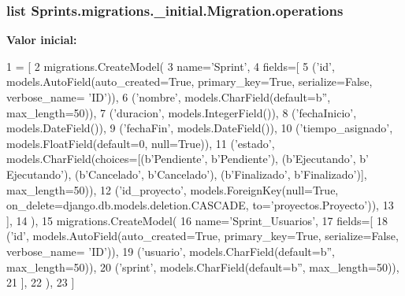 \subsubsection[{\texorpdfstring{operations}{operations}}]{\setlength{\rightskip}{0pt plus 5cm}list Sprints.\+migrations.\+\_\+initial.\+Migration.\+operations\hspace{0.3cm}{\ttfamily [static]}}\hypertarget{class_sprints_1_1migrations_1_10001__initial_1_1_migration_ab7ef4aab24ce79cb91f7d76fa8efae58}{}\label{class_sprints_1_1migrations_1_10001__initial_1_1_migration_ab7ef4aab24ce79cb91f7d76fa8efae58}
{\bfseries Valor inicial\+:}
\begin{DoxyCode}
1 = [
2         migrations.CreateModel(
3             name=\textcolor{stringliteral}{'Sprint'},
4             fields=[
5                 (\textcolor{stringliteral}{'id'}, models.AutoField(auto\_created=\textcolor{keyword}{True}, primary\_key=\textcolor{keyword}{True}, serialize=\textcolor{keyword}{False}, verbose\_name=\textcolor{stringliteral}{
      'ID'})),
6                 (\textcolor{stringliteral}{'nombre'}, models.CharField(default=b\textcolor{stringliteral}{''}, max\_length=50)),
7                 (\textcolor{stringliteral}{'duracion'}, models.IntegerField()),
8                 (\textcolor{stringliteral}{'fechaInicio'}, models.DateField()),
9                 (\textcolor{stringliteral}{'fechaFin'}, models.DateField()),
10                 (\textcolor{stringliteral}{'tiempo\_asignado'}, models.FloatField(default=0, null=\textcolor{keyword}{True})),
11                 (\textcolor{stringliteral}{'estado'}, models.CharField(choices=[(b\textcolor{stringliteral}{'Pendiente'}, b\textcolor{stringliteral}{'Pendiente'}), (b\textcolor{stringliteral}{'Ejecutando'}, b\textcolor{stringliteral}{'
      Ejecutando'}), (b\textcolor{stringliteral}{'Cancelado'}, b\textcolor{stringliteral}{'Cancelado'}), (b\textcolor{stringliteral}{'Finalizado'}, b\textcolor{stringliteral}{'Finalizado'})], max\_length=50)),
12                 (\textcolor{stringliteral}{'id\_proyecto'}, models.ForeignKey(null=\textcolor{keyword}{True}, on\_delete=django.db.models.deletion.CASCADE, 
      to=\textcolor{stringliteral}{'proyectos.Proyecto'})),
13             ],
14         ),
15         migrations.CreateModel(
16             name=\textcolor{stringliteral}{'Sprint\_Usuarios'},
17             fields=[
18                 (\textcolor{stringliteral}{'id'}, models.AutoField(auto\_created=\textcolor{keyword}{True}, primary\_key=\textcolor{keyword}{True}, serialize=\textcolor{keyword}{False}, verbose\_name=\textcolor{stringliteral}{
      'ID'})),
19                 (\textcolor{stringliteral}{'usuario'}, models.CharField(default=b\textcolor{stringliteral}{''}, max\_length=50)),
20                 (\textcolor{stringliteral}{'sprint'}, models.CharField(default=b\textcolor{stringliteral}{''}, max\_length=50)),
21             ],
22         ),
23     ]
\end{DoxyCode}


